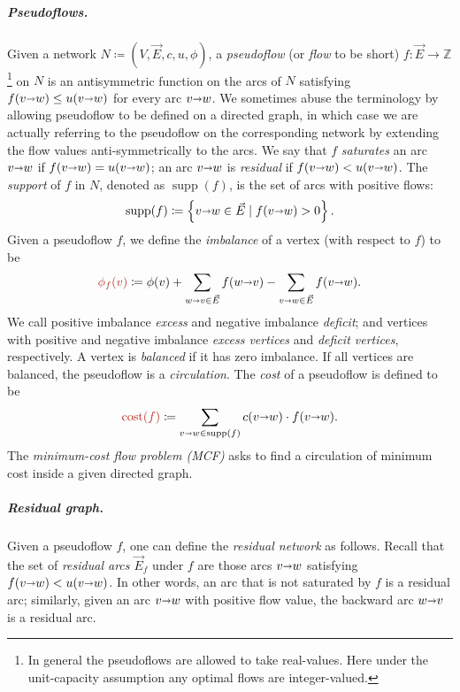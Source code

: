 \documentclass[a4paper,UKenglish]{socg-lipics-v2018}
\makeatletter
\def\note#1{\textcolor{red}{{#1}}}
\def\ints{\mathbb{Z}}
\def\Set#1{\left\{ #1 \right\}}
\def\fsupply{\phi}
\def\arcto{\mathord\shortrightarrow}
\def\arc#1#2{#1\arcto#2}
\def\cost{\operatorname{cost}}
\def\supp{\operatorname{supp}}
\theoremstyle{plain}
\numberwithin{figure}{section}
\renewcommand{\paragraph}{\subparagraph}
\def\EMPH#1{\textcolor{BrickRed}{{\emph{#1}}}}
\def\n@te#1{\textsf{\boldmath \textbf{$\langle\!\langle$#1$\rangle\!\rangle$}}\leavevmode}
\def\note#1{\textcolor{red}{\n@te{#1}}}
\makeatother
\begin{document}
\begin{toappendix}
\paragraph{Pseudoflows.}
Given a network $N \coloneqq (V,\vec{E},c,u,\fsupply)$,
a \EMPH{pseudoflow} (or \EMPH{flow} to be short) $f\colon \vec{E} \to \ints$%
\footnote{In general the pseudoflows are allowed to take real-values. Here under the unit-capacity assumption any optimal flows are integer-valued.}
on $N$ is an antisymmetric function on the arcs of $N$ satisfying $f(\arc vw) \leq u(\arc vw)$ for every arc $\arc vw$.%
%
We sometimes abuse the terminology by allowing pseudoflow to be defined on a directed graph, in which case we are actually referring to the pseudoflow on the corresponding network by extending the flow values anti-symmetrically to the arcs.
%
We say that $f$ \EMPH{saturates} an arc $\arc vw$ if $f(\arc vw) = u(\arc vw)$; an arc $\arc vw$ is \EMPH{residual} if $f(\arc vw) < u(\arc vw)$.
The \EMPH{support} of $f$ in $N$, denoted as \EMPH{$\supp(f)$}, is the set of arcs with positive flows:
\[
\supp(f) \coloneqq \Set{\arc vw \in \vec{E} \mid f(\arc vw) > 0}.
\]
%
Given a pseudoflow $f$, we define the \EMPH{imbalance} of a vertex (with respect to $f$) to be
\[
\EMPH{$\fsupply_f (v)$} \coloneqq \fsupply(v) + \sum_{\arc wv \in \vec{E}}{f(\arc wv)} - \sum_{\arc vw \in \vec{E}}{f(\arc vw)}.
\]
We call positive imbalance \EMPH{excess} and negative imbalance \EMPH{deficit};
and vertices with positive and negative imbalance \EMPH{excess vertices} and
\EMPH{deficit vertices}, respectively.
A vertex is \EMPH{balanced} if it has zero imbalance.
If all vertices are balanced, the pseudoflow is a \EMPH{circulation}.
The \EMPH{cost} of a pseudoflow
is defined to be
\[
 \EMPH{$\cost(f)$} \coloneqq \sum_{\arc vw \in \supp(f)} c(\arc vw) \cdot f(\arc vw).
\]
%
The \EMPH{minimum-cost flow problem (MCF)} asks to find a circulation of minimum cost inside a given directed graph.

\paragraph{Residual graph.}
Given a pseudoflow $f$, one can define the \emph{residual network} as follows.
%
Recall that the set of \emph{residual arcs $\vec{E}_f$} under $f$ are those arcs $\arc vw$ satisfying $f(\arc vw) < u(\arc vw)$.  In other words, an arc that is not saturated by $f$ is a residual arc; similarly, given an arc $\arc vw$ with positive flow value, the backward arc $\arc wv$ is a residual arc.


\end{toappendix}
\end{document}
